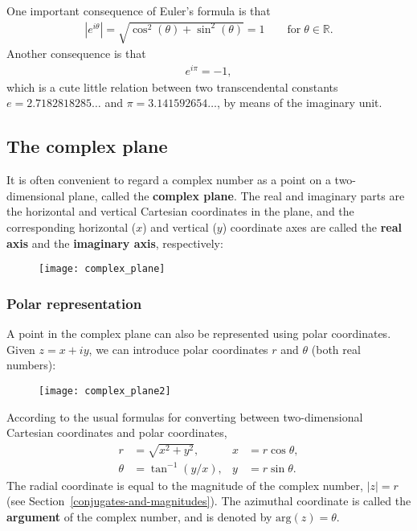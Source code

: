\documentclass[10pt,a4paper]{article}
\begin{document}
One important consequence of Euler's formula is that
\begin{align}
  \left|e^{i\theta}\right| = \sqrt{\cos^2(\theta) + \sin^2(\theta)} = 1 \qquad \mathrm{for}\; \theta \in \mathbb{R}.
\end{align}
Another consequence is that
\begin{align}
  e^{i\pi} = -1,
\end{align}
which is a cute little relation between two transcendental constants
$e = 2.7182818285\dots$ and $\pi = 3.141592654\dots$, by means of the
imaginary unit.

\subsection{The complex plane}
\label{the-complex-plane}

It is often convenient to regard a complex number as a point on a
two-dimensional plane, called the \textbf{complex plane}.  The real
and imaginary parts are the horizontal and vertical Cartesian
coordinates in the plane, and the corresponding horizontal ($x$) and
vertical ($y$) coordinate axes are called the \textbf{real axis} and
the \textbf{imaginary axis}, respectively:

\begin{figure}[ht]
  \centering\texttt{[image: complex\_plane]}
\end{figure}

\subsubsection{Polar representation}
\label{polar-representation}

A point in the complex plane can also be represented using polar
coordinates. Given $z = x + i y$, we can introduce polar coordinates
$r$ and $\theta$ (both real numbers):

\begin{figure}[ht]
  \centering\texttt{[image: complex\_plane2]}
\end{figure}

According to the usual formulas for converting between two-dimensional
Cartesian coordinates and polar coordinates,
\begin{align}
  r &= \sqrt{x^2 + y^2}, & x &= r\cos\theta, \\
  \theta &= \tan^{-1}(y/x), & y &= r\sin\theta.
\end{align}
The radial coordinate is equal to the magnitude of the complex number,
$|z| = r$ (see Section~\ref{conjugates-and-magnitudes}).  The
azimuthal coordinate is called the \textbf{argument} of the complex
number, and is denoted by $\mathrm{arg}(z) = \theta$.
\end{document}
